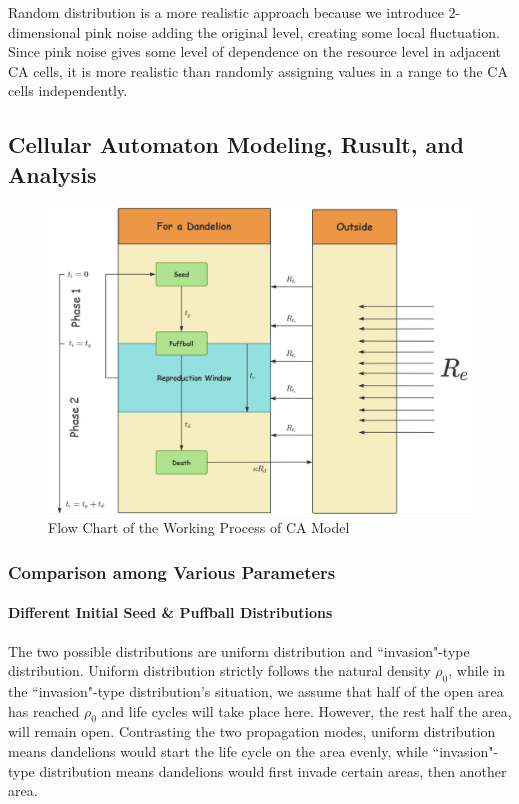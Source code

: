\documentclass[12pt]{article}
\begin{document}
Random distribution is a more realistic approach because we introduce $2$-dimensional pink noise adding the original level, creating some local fluctuation. Since pink noise gives some level of dependence on the resource level in adjacent CA cells, it is more realistic than randomly assigning values in a range to the CA cells independently.

\subsection{Cellular Automaton Modeling, Rusult, and Analysis}
\begin{figure}[h]
    \centering
    \includegraphics[width=\linewidth]{img/process.png}
    \caption{Flow Chart of the Working Process of CA Model}
    \label{process}
\end{figure}

\subsubsection{Comparison among Various Parameters}

\paragraph{Different Initial Seed \& Puffball Distributions}
The two possible distributions are uniform distribution and ``invasion"-type distribution. Uniform distribution strictly follows the natural density $\rho_0$, while in the ``invasion"-type distribution's situation, we assume that half of the open area has reached $\rho_0$ and life cycles will take place here. However, the rest half the area, will remain open. Contrasting the two propagation modes, uniform distribution means dandelions would start the life cycle on the area evenly, while ``invasion"-type distribution means dandelions would first invade certain areas, then another area. 
\end{document}
